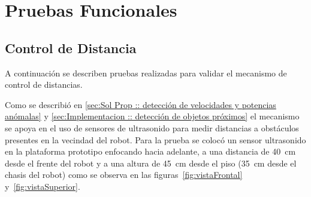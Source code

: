 \documentclass[withindex,glossary]{cam-thesis}
\begin{document}
\section{Pruebas Funcionales}
\subsection{Control de Distancia}
A continuación se describen pruebas realizadas para validar el mecanismo de control de distancias.

Como se describió en \ref{sec:Sol Prop :: detección de velocidades y potencias anómalas} y \ref{sec:Implementacion :: detección de objetos próximos} el mecanismo se apoya en el uso de sensores de ultrasonido para medir distancias a obstáculos presentes en la vecindad del robot. Para la prueba se colocó un sensor ultrasonido en la plataforma prototipo enfocando hacia adelante, a una distancia de \SI{40}{\centi\metre} desde el frente del robot y a una altura de \SI{45}{\centi\metre} desde el piso (\SI{35}{\centi\metre} desde el chasis del robot) como se observa en las figuras~\ref{fig:vistaFrontal} y~\ref{fig:vistaSuperior}.
\end{document}
